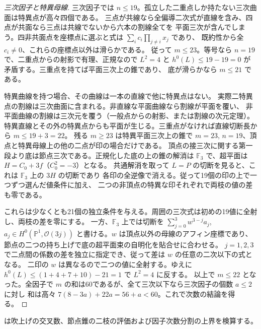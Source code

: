 \begin{proof}[三次因子と特異母線]
三次因子では $n\le19$。孤立した二重点しか持たない三次曲面は特異点が高々四個である。
三点が共線なら全偏導二次式が直線を含み、四点が共面なら三点は共線でないから六本の割線全てを
平面三次が含んでしまう。四非共面点を座標点に選ぶと式は $\sum_i c_i\prod_{j\ne i}x_j$ であり、
既約性から全 $c_i\ne0$、これらの座標点以外は滑らかである。
従って $m\le23$。等号なら $n=19$ で、二重点からの射影で有理、正規なので
$L^2=4$ と $h^0(L)\le19-19=0$ が矛盾する。三重点を持てば平面三次上の錐であり、
底が滑らかなら $m\le21$ である。

特異曲線を持つ場合、その曲線は一本の直線で他に特異点はない。
実際二特異点の割線は三次曲面に含まれる。非直線な平面曲線なら割線が平面を覆い、
非平面曲線の割線は三次元を覆う（一般点からの射影、または割線の次元定理）。
特異直線とその外の特異点からも平面が生じる。三重点がなければ直線切断長から $m\le19+3=22$。
残る $m\ge23$ は特異平面三次上の錐で $m=23$, $n=19$、頂点と特異母線上の他の二点が印の場合だけである。
頂点の接三次に関する第一段より底は節点三次である。正規化した底の上の錐の解消は
$\mathbb F_3$ で、超平面は $H=C_0+3f$（$C_0^2=-3$）となる。
共通解消を取って $L=P$ の切断を見ると、これは $\mathbb F_3$ 上の $3H$ の切断であり
各印の全逆像で消える。従って19個の印の上で一つずつ選んだ値条件に加え、
二つの非頂点の特異な印それぞれで両枝の値の差も零である。

これらは少なくとも21個の独立条件を与える。周囲の三次式は初めの19値に全射し、両枝の差を零にする。
一方、$\mathbb F_3$ 上では切断を $\sum_{j=0}^3 w^{3-j} a_j$,
$a_j\in H^0(\mathbb P^1,\mathcal O(3j))$ と書ける。$w$ は頂点以外の母線のアフィン座標であり、
節点の二つの持ち上げで底の超平面束の自明化を貼合せに合わせる。
$j=1,2,3$ で二点間の係数の差を独立に指定でき、従って差は $w$ の任意の二次以下の式となる。
二印の $w$ は異なるので二つの値に全射する。ゆえに $h^0(L)\le(1+4+7+10)-21=1$ で $L^2=4$ に反する。
以上で $m\le22$ となった。全因子で $m$ の和は60であるが、全て三次以下なら三次因子の個数 $a\le2$ に対し
和は高々 $7(8-3a)+22a=56+a<60$。これで次数の結論を得る。
\end{proof}

 は吹上げの交叉数、節点錐の二枝の評価および因子次数分割の上界を検算する。
